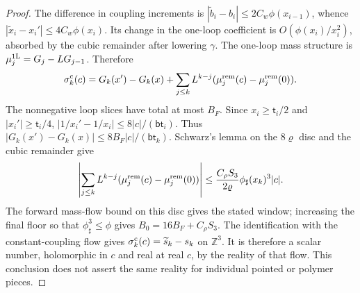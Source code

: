 \documentclass[11pt,letterpaper,reqno]{amsart}
\theoremstyle{definition}
\theoremstyle{remark}
\begin{document}
\begin{proof}
The difference in coupling increments is
$|\tilde b_i-b_i|\le2C_w\phi(x_{i-1})$, whence
$|\tilde x_i-x_i'|\le4C_w\phi(x_i)$. Its change in the
one-loop coefficient is $O(\phi(x_i)/x_i^2)$, absorbed
by the cubic remainder after lowering $\gamma$.
The one-loop mass structure is
$\mu_j^{\rm 1L}=G_j-LG_{j-1}$. Therefore
\[
 \sigma_k^{\rm c}(c)=G_k(x')-G_k(x)+
 \sum_{j\le k}L^{k-j}
            (\mu_j^{\rm rem}(c)-\mu_j^{\rm rem}(0)).
\]
The nonnegative loop slices have total at most $B_F$.
Since $x_i\ge\mathsf t_i/2$ and $|x_i'|\ge\mathsf t_i/4$,
$|1/x_i'-1/x_i|\le8|c|/(\mathsf b\mathsf t_i)$.
Thus $|G_k(x')-G_k(x)|\le8B_F|c|/(\mathsf b\mathsf t_k)$.
Schwarz's lemma on the $8\varrho$ disc and the
cubic remainder give
\[
 \left|\sum_{j\le k}L^{k-j}
       (\mu_j^{\rm rem}(c)-\mu_j^{\rm rem}(0))\right|
 \le\frac{C_\rho S_3}{2\varrho}\phi_\sharp(x_k)^3|c|.
\]
The forward mass-flow bound on this disc gives the stated
window; increasing the final floor so that
$\phi_\sharp^3\le\phi$ gives $B_0=16B_F+C_\rho S_3$.
The identification with the constant-coupling flow gives
$\sigma_k^{\rm c}(c)=\widetilde s_k-s_k$ on $\mathbb Z^3$.
It is therefore a scalar number, holomorphic in $c$ and real
at real $c$, by the reality of that flow. This conclusion
does not assert the same reality for individual pointed
or polymer pieces.


\end{proof}
\end{document}
